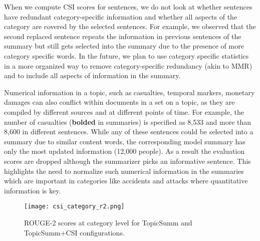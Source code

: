 When we compute CSI scores for sentences, we do not look at whether sentences have redundant category-specific information and whether all aspects of the category are covered by the selected sentences.
For example, we observed that the second replaced sentence repeats the information in previous sentences of the summary but still gets selected into the summary due to the presence of more category specific words. In the future, we plan to use category specific statistics in a more organized way to remove category-specific redundancy (akin to MMR) and to include all aspects of information in the summary. 

Numerical information in a topic, such as casualties, temporal markers, monetary damages can also conflict within documents in a set on a topic, as they are compiled by different sources and at different points of time. For example, the number of casualties (\textbf{bolded} in summaries) is specified as 8,533 and more than 8,600 in different sentences. While any of these sentences could be selected into a summary due to similar content words, the corresponding model summary has only the most updated information (12,000 people). As a result the evaluation scores are dropped although the summarizer picks an informative sentence. This highlights the need to normalize such numerical information in the summaries which are important in categories like accidents and attacks where quantitative information is key.

\begin{figure}[h]
\centering		
\texttt{[image: csi\_category\_r2.png]}
\caption{ROUGE-2 scores at category level for TopicSumm and TopicSumm+CSI configurations.}
\label{fig:csi-r2}
\end{figure}
 
